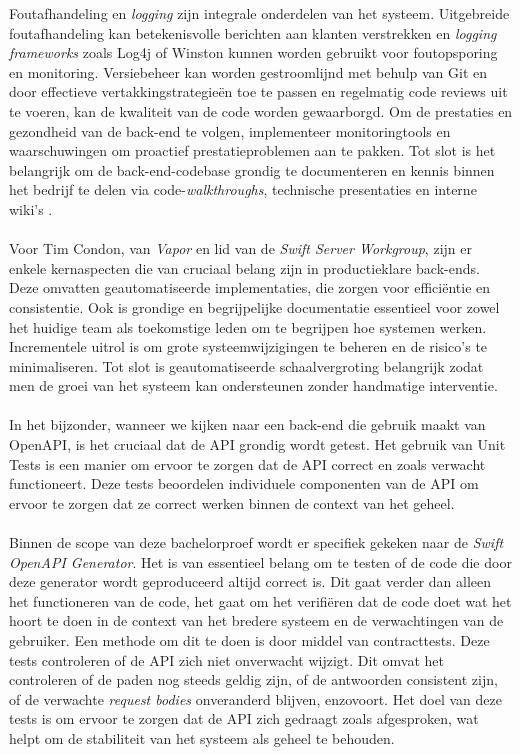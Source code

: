 Foutafhandeling en \textit{logging} zijn integrale onderdelen van het systeem. Uitgebreide foutafhandeling kan betekenisvolle berichten aan klanten verstrekken en \textit{logging frameworks} zoals Log4j of Winston kunnen worden gebruikt voor foutopsporing en monitoring. Versiebeheer kan worden gestroomlijnd met behulp van Git en door effectieve vertakkingstrategieën toe te passen en regelmatig code reviews uit te voeren, kan de kwaliteit van de code worden gewaarborgd. Om de prestaties en gezondheid van de back-end te volgen, implementeer monitoringtools en waarschuwingen om proactief prestatieproblemen aan te pakken. Tot slot is het belangrijk om de back-end-codebase grondig te documenteren en kennis binnen het bedrijf te delen via code-\textit{walkthroughs}, technische presentaties en interne wiki's \autocite{Senthilkumar2023}. 
 \\  \\
Voor Tim Condon, van \textit{Vapor} en lid van de \textit{Swift Server Workgroup}, zijn er enkele kernaspecten die van cruciaal belang zijn in productieklare back-ends. Deze omvatten geautomatiseerde implementaties, die zorgen voor efficiëntie en consistentie. Ook is grondige en begrijpelijke documentatie essentieel voor zowel het huidige team als toekomstige leden om te begrijpen hoe systemen werken.  Incrementele uitrol is om grote systeemwijzigingen te beheren en de risico's te minimaliseren. Tot slot is geautomatiseerde schaalvergroting belangrijk zodat men de groei van het systeem kan ondersteunen zonder handmatige interventie.
 \\  \\
In het bijzonder, wanneer we kijken naar een back-end die gebruik maakt van OpenAPI, is het cruciaal dat de API grondig wordt getest. Het gebruik van Unit Tests is een manier om ervoor te zorgen dat de API correct en zoals verwacht functioneert. Deze tests beoordelen individuele componenten van de API om ervoor te zorgen dat ze correct werken binnen de context van het geheel.\\ \\
Binnen de scope van deze bachelorproef wordt er specifiek gekeken naar de \textit{Swift OpenAPI Generator}. Het is van essentieel belang om te testen of de code die door deze generator wordt geproduceerd altijd correct is. Dit gaat verder dan alleen het functioneren van de code,  het gaat om het verifiëren dat de code doet wat het hoort te doen in de context van het bredere systeem en de verwachtingen van de gebruiker. Een methode om dit te doen is door middel van contracttests. Deze tests controleren of de API zich niet onverwacht wijzigt. Dit omvat het controleren of de paden nog steeds geldig zijn, of de antwoorden consistent zijn, of de verwachte \textit{request bodies} onveranderd blijven, enzovoort. Het doel van deze tests is om ervoor te zorgen dat de API zich gedraagt zoals afgesproken, wat helpt om de stabiliteit van het systeem als geheel te behouden. 

